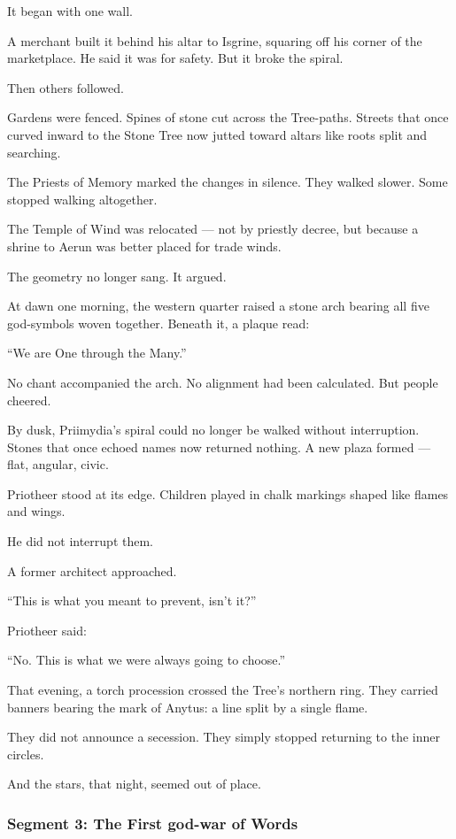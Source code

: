 \documentclass[9pt]{article}
\begin{document}
It began with one wall.

A merchant built it behind his altar to Isgrine,  
squaring off his corner of the marketplace.  
He said it was for safety.  
But it broke the spiral.

Then others followed.

Gardens were fenced.  
Spines of stone cut across the Tree-paths.  
Streets that once curved inward to the Stone Tree  
now jutted toward altars like roots split and searching.

The Priests of Memory marked the changes in silence.  
They walked slower.  
Some stopped walking altogether.

The Temple of Wind was relocated — not by priestly decree,  
but because a shrine to Aerun was better placed for trade winds.

The geometry no longer sang.  
It argued.

At dawn one morning, the western quarter raised a stone arch  
bearing all five god-symbols woven together.  
Beneath it, a plaque read:

 “We are One through the Many.”

No chant accompanied the arch.  
No alignment had been calculated.  
But people cheered.

By dusk, Priimydia’s spiral could no longer be walked without interruption.  
Stones that once echoed names now returned nothing.  
A new plaza formed — flat, angular, civic.

Priotheer stood at its edge.  
Children played in chalk markings shaped like flames and wings.

He did not interrupt them.

A former architect approached.

 “This is what you meant to prevent, isn’t it?”

Priotheer said:

 “No. This is what we were always going to choose.”

That evening, a torch procession crossed the Tree’s northern ring.  
They carried banners bearing the mark of Anytus:  
a line split by a single flame.

They did not announce a secession.  
They simply stopped returning to the inner circles.

And the stars, that night, seemed out of place.

\newpage

\subsubsection*{Segment 3: The First god-war of Words}
\end{document}
